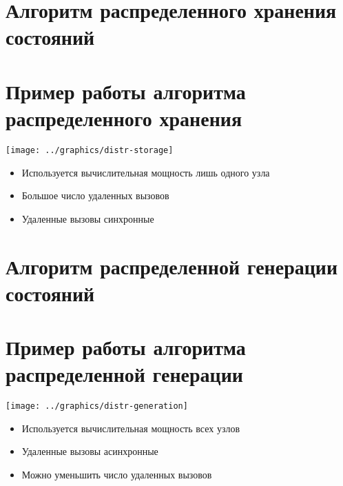 \documentclass[12pt]{article}
\begin{document}
\section{Алгоритм распределенного хранения состояний}
\label{sec:distr-storage}



\section{Пример работы алгоритма распределенного хранения}
\label{sec:distr-storage2}

\begin{minipage}[m]{0.5\linewidth}
  \texttt{[image: ../graphics/distr-storage]}
\end{minipage}
\begin{minipage}[m]{0.5\linewidth}
  \begin{flushleft}
    \begin{itemize}
    \item Используется вычислительная мощность лишь одного узла
    \item Большое число удаленных вызовов
    \item Удаленные вызовы синхронные
    \end{itemize}
  \end{flushleft}
\end{minipage}

\section{Алгоритм распределенной генерации состояний}
\label{sec:distr-generation}



\section{Пример работы алгоритма распределенной генерации}
\label{sec:distr-generation2}

\begin{minipage}[m]{0.55\linewidth}
  \texttt{[image: ../graphics/distr-generation]}
\end{minipage}
\begin{minipage}[m]{0.45\linewidth}
  \begin{flushleft}
    \begin{itemize}
    \item Используется вычислительная мощность всех узлов
    \item Удаленные вызовы асинхронные
    \item Можно уменьшить число удаленных вызовов
    \end{itemize}
  \end{flushleft}
\end{minipage}
\end{document}
